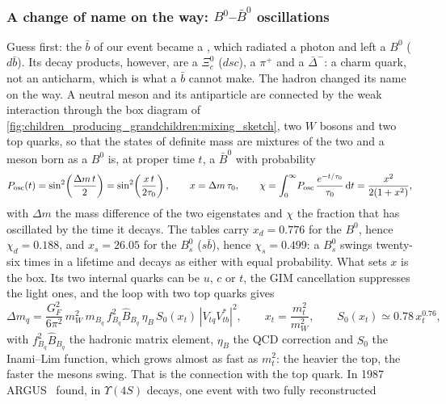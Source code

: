 \subsubsection{A change of name on the way: \texorpdfstring{$B^0$--$\bar B^0$}{B0-B0bar} oscillations}
\label{sec:children_producing_grandchildren:mixing}

Guess first: the $\bar b$ of our event became a \Bstar, which radiated a
photon and left a $B^0$ ($d\bar b$). Its decay products, however, are a
$\Xi_c^0$ ($dsc$), a $\pi^+$ and a $\bar\Delta^-$: a charm quark, not an
anticharm, which is what a $\bar b$ cannot make. The hadron changed its
name on the way. A neutral meson and its antiparticle are connected by
the weak interaction through the box diagram of
\cref{fig:children_producing_grandchildren:mixing_sketch}, two $W$ bosons
and two top quarks, so that the states of definite mass are mixtures of
the two and a meson born as a $B^0$ is, at proper time $t$, a $\bar B^0$
with probability
\begin{equation}
  P_{\mathrm{osc}}(t)=\sin^2\!\left(\frac{\Delta m\,t}{2}\right)
  =\sin^2\!\left(\frac{x\,t}{2\tau_0}\right),\qquad
  x=\Delta m\,\tau_0,\qquad
  \chi=\int_0^\infty\!P_{\mathrm{osc}}\,\frac{e^{-t/\tau_0}}{\tau_0}\,\mathrm{d}t
  =\frac{x^2}{2(1+x^2)},
  \label{eq:children_producing_grandchildren:mixing}
\end{equation}
with $\Delta m$ the mass difference of the two eigenstates and $\chi$ the
fraction that has oscillated by the time it decays. The tables carry
$x_d=0.776$ for the $B^0$, hence $\chi_d=0.188$, and $x_s=26.05$ for the
$B_s^0$ ($s\bar b$), hence $\chi_s=0.499$: a $B_s^0$ swings twenty-six
times in a lifetime and decays as either with equal probability. What
sets $x$ is the box. Its two internal quarks can be $u$, $c$ or $t$, the
GIM cancellation suppresses the light ones, and the loop with two top
quarks gives~\cite{Inami:1980fz,Buras:1990fn}
\begin{equation}
  \Delta m_q=\frac{G_F^2}{6\pi^2}\,m_W^2\,m_{B_q}\,f_{B_q}^2\hat B_{B_q}\,
  \eta_B\,S_0(x_t)\,|V_{tq}V_{tb}^*|^2,\qquad
  x_t=\frac{m_t^2}{m_W^2},\qquad S_0(x_t)\simeq0.78\,x_t^{0.76},
  \label{eq:children_producing_grandchildren:boxdm}
\end{equation}
with $f_{B_q}^2\hat B_{B_q}$ the hadronic matrix element, $\eta_B$ the
QCD correction and $S_0$ the Inami--Lim function, which grows almost as
fast as $m_t^2$: the heavier the top, the faster the mesons swing. That
is the connection with the top quark. In 1987 ARGUS~\cite{ARGUS:1987xtv}
found, in $\Upsilon(4S)$ decays, one event with two fully reconstructed
